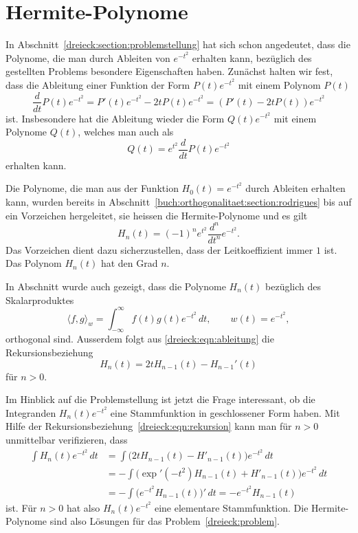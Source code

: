 %
%
%
\section{Hermite-Polynome
\label{dreieck:section:hermite-polynome}}
In Abschnitt~\ref{dreieck:section:problemstellung} hat sich schon angedeutet,
dass die Polynome, die man durch Ableiten von $e^{-t^2}$ erhalten
kann, bezüglich des gestellten Problems besondere Eigenschaften
haben.
Zunächst halten wir fest, dass die Ableitung einer Funktion der Form
$P(t)e^{-t^2}$ mit einem Polynom $P(t)$ 
\begin{equation}
\frac{d}{dt} P(t)e^{-t^2}
=
P'(t)e^{-t^2} -2tP(t)e^{-t^2}
=
(P'(t)-2tP(t)) e^{-t^2}
\label{dreieck:eqn:ableitung}
\end{equation}
ist.
Insbesondere hat die Ableitung wieder die Form $Q(t)e^{-t^2}$
mit einem Polynome $Q(t)$, welches man auch als
\[
Q(t)
=
e^{t^2}\frac{d}{dt}P(t)e^{-t^2}
\]
erhalten kann.

Die Polynome, die man aus der Funktion $H_0(t)=e^{-t^2}$ durch
Ableiten erhalten kann, wurden bereits in
Abschnitt~\ref{buch:orthogonalitaet:section:rodrigues}
bis auf ein Vorzeichen hergeleitet, sie heissen die Hermite-Polynome 
%
und es gilt
\[
H_n(t) 
=
(-1)^n
e^{t^2} \frac{d^n}{dt^n} e^{-t^2}.
\]
Das Vorzeichen dient dazu sicherzustellen, dass der Leitkoeffizient
immer $1$ ist.
Das Polynom $H_n(t)$ hat den Grad $n$.

In Abschnitt wurde auch gezeigt, dass die Polynome $H_n(t)$
bezüglich des Skalarproduktes
\[
\langle f,g\rangle_{w}
=
\int_{-\infty}^\infty f(t)g(t)e^{-t^2}\,dt,
\qquad
w(t)=e^{-t^2},
\]
orthogonal sind.
Ausserdem folgt aus \eqref{dreieck:eqn:ableitung}
die Rekursionsbeziehung
\begin{equation}
H_{n}(t)
=
2tH_{n-1}(t)
-
H_{n-1}'(t)
\label{dreieck:eqn:rekursion}
\end{equation}
für $n>0$.

Im Hinblick auf die Problemstellung ist jetzt die Frage interessant,
ob die Integranden $H_n(t)e^{-t^2}$ eine Stammfunktion in geschlossener
Form haben.
Mit Hilfe der Rekursionsbeziehung~\eqref{dreieck:eqn:rekursion}
kann man für $n>0$ unmittelbar verifizieren, dass
\begin{align*}
\int H_n(t)e^{-t^2}\,dt
&=
\int \bigl( 2tH_{n-1}(t) - H'_{n-1}(t)\bigr)e^{-t^2}\,dt
\\
&=
-\int \bigl( \exp'(-t^2) H_{n-1}(t) + H'_{n-1}(t)\bigr)e^{-t^2}\,dt
\\
&=
-\int \bigl( e^{-t^2}H_{n-1}(t)\bigr)' \,dt
=
-e^{-t^2}H_{n-1}(t)
\end{align*}
ist.
Für $n>0$ hat also $H_n(t)e^{-t^2}$ eine elementare Stammfunktion.
Die Hermite-Polynome sind also Lösungen für das
Problem~\ref{dreieck:problem}.


